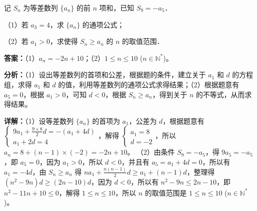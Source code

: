 \begin{question}[points=12]
记 $S_n$ 为等差数列 $\{a_n\}$ 的前 $n$ 项和，已知 $S_9 = -a_5$．

（1）若 $a_3=4$，求 $\{a_n\}$ 的通项公式；

（2）若 $a_1>0$，求使得 $S_n \ge a_n$ 的 $n$ 的取值范围．
\begin{solution}
\textbf{答案：}（1）$a_n = -2n+10$；（2）$1 \le n \le 10$ ($n \in \mathbb{N}^*$)。

\textbf{分析：}（1）设出等差数列的首项和公差，根据题的条件，建立关于 $a_1$ 和 $d$ 的方程组，求得 $a_1$ 和 $d$ 的值，利用等差数列的通项公式求得结果；（2）根据题意有 $a_5=0$，根据 $a_1>0$，可知 $d<0$，根据 $S_n \ge a_n$，得到关于 $n$ 的不等式，从而求得结果。

\textbf{详解：}（1）设等差数列 $\{a_n\}$ 的首项为 $a_1$，公差为 $d$，根据题意有 $\begin{cases} 9a_1 + \frac{9 \times 8}{2}d = -(a_1+4d) \\ a_1+2d=4 \end{cases}$，解得 $\begin{cases} a_1=8 \\ d=-2 \end{cases}$，所以 $a_n = 8 + (n-1) \times (-2) = -2n+10$。
（2）由条件 $S_9 = -a_5$，得 $9a_5 = -a_5$，即 $a_5=0$，因为 $a_1>0$，所以 $d<0$，并且有 $a_5=a_1+4d=0$，所以有 $a_1=-4d$，由 $S_n \ge a_n$ 得 $na_1+\frac{n(n-1)}{2}d \ge a_1+(n-1)d$，整理得 $(n^2-9n)d \ge (2n-10)d$，因为 $d<0$，所以有 $n^2-9n \le 2n-10$，即 $n^2-11n+10 \le 0$，解得 $1 \le n \le 10$，所以 $n$ 的取值范围是 $1 \le n \le 10$ ($n \in \mathbb{N}^*$)。
\end{solution}
\end{question}

